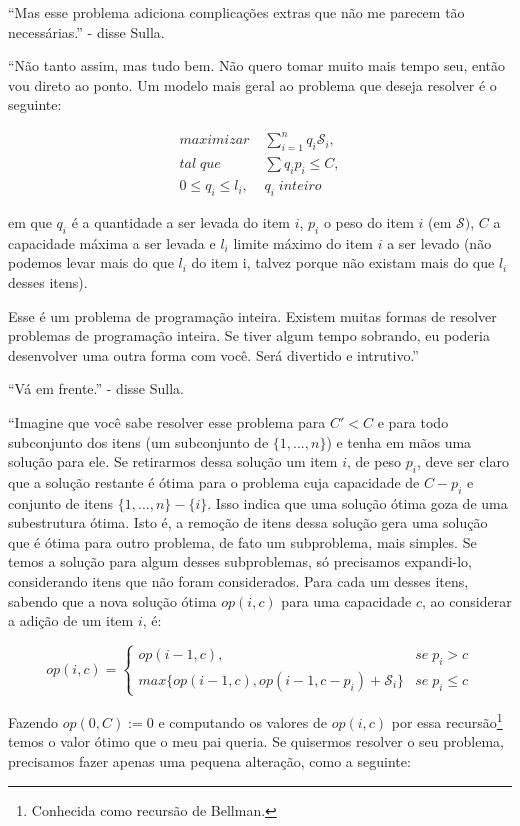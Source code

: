 \documentclass{article}
\begin{document}
``Mas esse problema adiciona complicações extras que não me parecem
tão necessárias.'' - disse Sulla.

``Não tanto assim, mas tudo bem. Não quero tomar muito mais tempo seu,
então vou direto ao ponto. Um modelo mais geral ao problema que deseja
resolver é o seguinte:

\begin{align*}
  maximizar \;& \sum\limits_{i=1}^n q_i \mathscr{S}_i,\\ tal\; que\;&
  \sum{q_i p_i} \leq C,\\ 0 \leq q_i \leq l_i,\; & q_i \; inteiro
\end{align*}

\noindent em que $q_i$ é a quantidade a ser levada do item $i$, $p_i$
o peso do item $i$ (em $\mathscr{S})$, $C$ a capacidade máxima a ser
levada e $l_i$ limite máximo do item $i$ a ser levado (não podemos
levar mais do que $l_i$ do item i, talvez porque não existam mais do
que $l_i$ desses itens).

Esse é um problema de programação inteira. Existem muitas formas de
resolver problemas de programação inteira. Se tiver algum tempo
sobrando, eu poderia desenvolver uma outra forma com você. Será
divertido e intrutivo.''

``Vá em frente.'' - disse Sulla.

``Imagine que você sabe resolver esse problema para $C' < C$ e para
todo subconjunto dos itens (um subconjunto de $\{1, ..., n\}$) e tenha
em mãos uma solução para ele. Se retirarmos dessa solução um item $i$,
de peso $p_i$, deve ser claro que a solução restante é ótima para o
problema cuja capacidade de $C - p_i$ e conjunto de itens $\{1, ...,
n\}-\{i\}$. Isso indica que uma solução ótima goza de uma subestrutura
ótima. Isto é, a remoção de itens dessa solução gera uma solução que é
ótima para outro problema, de fato um subproblema, mais simples. Se
temos a solução para algum desses subproblemas, só precisamos
expandi-lo, considerando itens que não foram considerados. Para cada
um desses itens, sabendo que a nova solução ótima $op(i,c)$ para uma
capacidade $c$, ao considerar a adição de um item $i$, é:

\[
op(i,c) =
\begin{cases}
  op(i-1, c), & se\; p_i > c\\ max\{op(i-1, c), op(i-1, c-p_i) +
  \mathscr{S}_i\} & se\; p_i \leq c
\end{cases}
\]

Fazendo $op(0, C) := 0$ e computando os valores de $op(i, c)$ por essa
recursão\footnote{Conhecida como recursão de Bellman.} temos o valor
ótimo que o meu pai queria. Se quisermos resolver o seu problema,
precisamos fazer apenas uma pequena alteração, como a seguinte:
\end{document}
